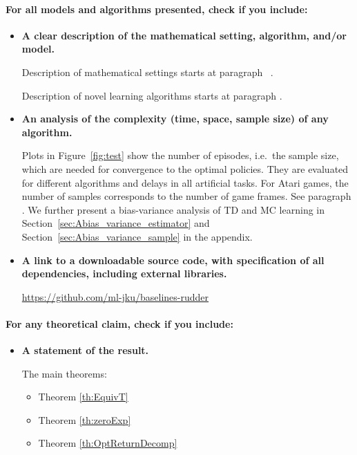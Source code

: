 \documentclass{article}
\begin{document}
\begin{appendices}
\paragraph{For all models and algorithms presented, check if you include:}
\begin{itemize}
    \item \textbf{A clear description of the mathematical setting, algorithm, and/or model.}
    
    Description of mathematical settings starts at paragraph ~.
    
    Description of novel learning algorithms starts at paragraph .
    \item \textbf{An analysis of the complexity (time, space, sample size) of any algorithm.}
    
    Plots in Figure~\ref{fig:test} show the number of episodes, i.e.\ the sample size, which are needed for convergence to the optimal policies. They are evaluated for different algorithms and delays in all artificial tasks.
    For Atari games, the number of samples corresponds to the number of game frames. See paragraph .
    We further present a bias-variance analysis of TD and MC learning in Section~\ref{sec:Abias_variance_estimator} and Section~\ref{sec:Abias_variance_sample} in the appendix.
\item \textbf{A link to a downloadable source code, with specification of all dependencies, including external libraries.}
    
    \href{https://github.com/ml-jku/baselines-rudder}{https://github.com/ml-jku/baselines-rudder}
\end{itemize}

\paragraph{For any theoretical claim, check if you include:}
\begin{itemize}
    \item \textbf{A statement of the result.}
    
    The main theorems:
    \begin{itemize}
        \item Theorem \ref{th:EquivT}
        \item Theorem \ref{th:zeroExp}
        \item Theorem \ref{th:OptReturnDecomp}
    \end{itemize}
    

\end{itemize}
\end{appendices}
\end{document}
